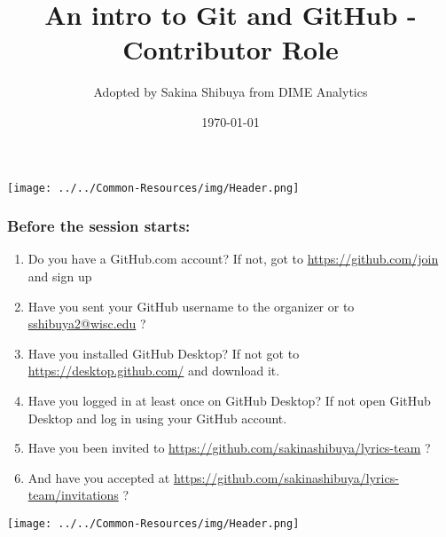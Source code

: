 \documentclass[aspectratio=169]{beamer} %
\title{An intro to Git and GitHub - Contributor Role}
\author{Adopted by Sakina Shibuya from DIME Analytics}
\institute{DIME - The World Bank - \trainingURL{https://www.worldbank.org/en/research/dime}}
\date{\today}
\makeatletter
\newcommand{\trainingURL}[1]{{\color{blue}\url{#1}}}
\newcommand{\traininerUsername}{sakinashibuya}
\newcommand{\repoName}{\traininerUsername/lyrics-team}
\newcommand{\trainingRepoURL}[1]{\trainingURL{https://github.com/\repoName #1}}
\newcommand{\trainerEmail}{\trainingURL{sshibuya2@wisc.edu} }
\makeatother
\begin{document}
\begin{frame}
\texttt{[image: ../../Common-Resources/img/Header.png]}
\vspace{-0.2cm}
\titlepage 	 %
\end{frame}

\begin{frame}
\frametitle{Before the session starts:}
	\begin{enumerate}
		\item Do you have a GitHub.com account? If not, got to \trainingURL{https://github.com/join} and sign up
		\item Have you sent your GitHub username to the organizer or to \trainerEmail?
		\item Have you installed GitHub Desktop? If not got to \trainingURL{https://desktop.github.com/} and download it.
		\item Have you logged in at least once on GitHub Desktop? If not open GitHub Desktop and log in using your GitHub account.
		\item Have you been invited to \trainingRepoURL{} ?
		\item And have you accepted at \trainingRepoURL{/invitations} ?
	\end{enumerate}

\end{frame}

\begin{frame}
\texttt{[image: ../../Common-Resources/img/Header.png]}
\vspace{-0.2cm}
\titlepage 	 %
\end{frame}
\end{document}
